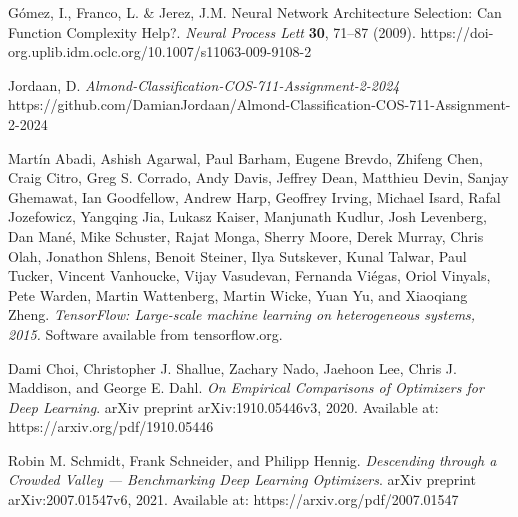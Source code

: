 \documentclass[conference]{IEEEtran}
\begin{document}
\begin{thebibliography}{00}
 Gómez, I., Franco, L. \& Jerez, J.M. Neural Network Architecture Selection: Can Function Complexity Help?. \textit{Neural Process Lett} \textbf{30}, 71–87 (2009). https://doi-org.uplib.idm.oclc.org/10.1007/s11063-009-9108-2 

 Jordaan, D. \textit{Almond-Classification-COS-711-Assignment-2-2024} https://github.com/DamianJordaan/Almond-Classification-COS-711-Assignment-2-2024

 Martín Abadi, Ashish Agarwal, Paul Barham, Eugene Brevdo,
Zhifeng Chen, Craig Citro, Greg S. Corrado, Andy Davis,
Jeffrey Dean, Matthieu Devin, Sanjay Ghemawat, Ian Goodfellow,
Andrew Harp, Geoffrey Irving, Michael Isard, Rafal Jozefowicz, Yangqing Jia,
Lukasz Kaiser, Manjunath Kudlur, Josh Levenberg, Dan Mané, Mike Schuster,
Rajat Monga, Sherry Moore, Derek Murray, Chris Olah, Jonathon Shlens,
Benoit Steiner, Ilya Sutskever, Kunal Talwar, Paul Tucker,
Vincent Vanhoucke, Vijay Vasudevan, Fernanda Viégas,
Oriol Vinyals, Pete Warden, Martin Wattenberg, Martin Wicke,
Yuan Yu, and Xiaoqiang Zheng.
\emph{TensorFlow: Large-scale machine learning on heterogeneous systems,
2015.} Software available from tensorflow.org.

Dami Choi, Christopher J. Shallue, Zachary Nado, Jaehoon Lee, Chris J. Maddison, and George E. Dahl.
\textit{On Empirical Comparisons of Optimizers for Deep Learning}.
arXiv preprint arXiv:1910.05446v3, 2020. Available at: 
https://arxiv.org/pdf/1910.05446

Robin M. Schmidt, Frank Schneider, and Philipp Hennig.
\textit{Descending through a Crowded Valley — Benchmarking Deep Learning Optimizers}.
arXiv preprint arXiv:2007.01547v6, 2021. Available at: https://arxiv.org/pdf/2007.01547

\end{thebibliography}
\end{document}
